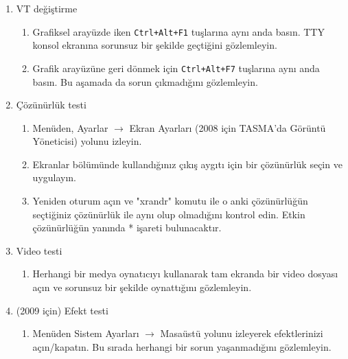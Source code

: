\documentclass[a4paper,10pt]{article}
\begin{document}
\begin{itemize}
\begin{enumerate}
  \item VT değiştirme
    \begin{enumerate}
    \item Grafiksel arayüzde iken \texttt{Ctrl+Alt+F1} tuşlarına aynı anda basın. TTY konsol ekranına sorunsuz bir şekilde geçtiğini gözlemleyin.
    \item Grafik arayüzüne geri dönmek için \texttt{Ctrl+Alt+F7} tuşlarına aynı anda basın. Bu aşamada da sorun çıkmadığını gözlemleyin.
    \end{enumerate}

  \item Çözünürlük testi
    \begin{enumerate}
    \item Menüden, Ayarlar $\rightarrow$ Ekran Ayarları (2008 için TASMA'da Görüntü Yöneticisi) yolunu izleyin.
    \item Ekranlar bölümünde kullandığınız çıkış aygıtı için bir çözünürlük seçin ve uygulayın.
    \item Yeniden oturum açın ve "xrandr" komutu ile o anki çözünürlüğün seçtiğiniz çözünürlük
          ile aynı olup olmadığını kontrol edin. Etkin çözünürlüğün yanında * işareti bulunacaktır.
    \end{enumerate}
 
  \item Video testi
    \begin{enumerate}
    \item Herhangi bir medya oynatıcıyı kullanarak tam ekranda bir video dosyası açın ve sorunsuz bir şekilde oynattığını gözlemleyin.
    \end{enumerate}
 
  \item (2009 için) Efekt testi
    \begin{enumerate}
    \item Menüden Sistem Ayarları $\rightarrow$ Masaüstü yolunu izleyerek efektlerinizi açın/kapatın. Bu sırada herhangi bir sorun yaşanmadığını gözlemleyin.
    \end{enumerate}
  \end{enumerate}
\end{itemize}
\end{document}

